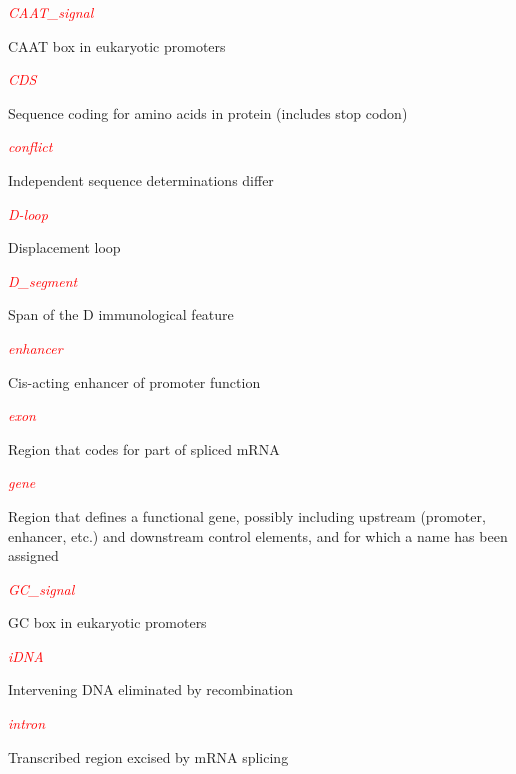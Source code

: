 \textcolor{red}{\textit{CAAT\_signal}}
\begin{adjustwidth}{2em}{}
CAAT box in eukaryotic promoters
\end{adjustwidth}

\textcolor{red}{\textit{CDS}}
\begin{adjustwidth}{2em}{}
Sequence coding for amino acids in protein (includes stop codon)
\end{adjustwidth}

\textcolor{red}{\textit{conflict}}
\begin{adjustwidth}{2em}{}
Independent sequence determinations differ
\end{adjustwidth}

\textcolor{red}{\textit{D-loop}}
\begin{adjustwidth}{2em}{}
Displacement loop
\end{adjustwidth}

\textcolor{red}{\textit{D\_segment}}
\begin{adjustwidth}{2em}{}
Span of the D immunological feature
\end{adjustwidth}

\textcolor{red}{\textit{enhancer}}
\begin{adjustwidth}{2em}{}
Cis-acting enhancer of promoter function
\end{adjustwidth}

\textcolor{red}{\textit{exon}}
\begin{adjustwidth}{2em}{}
Region that codes for part of spliced mRNA
\end{adjustwidth}

\textcolor{red}{\textit{gene}}
\begin{adjustwidth}{2em}{}
Region that defines a functional gene, possibly including upstream (promoter, enhancer, etc.) and downstream control elements, and for which a name has been assigned
\end{adjustwidth}

\textcolor{red}{\textit{GC\_signal}}
\begin{adjustwidth}{2em}{}
GC box in eukaryotic promoters
\end{adjustwidth}

\textcolor{red}{\textit{iDNA}}
\begin{adjustwidth}{2em}{}
Intervening DNA eliminated by recombination
\end{adjustwidth}

\textcolor{red}{\textit{intron}}
\begin{adjustwidth}{2em}{}
Transcribed region excised by mRNA splicing
\end{adjustwidth}

